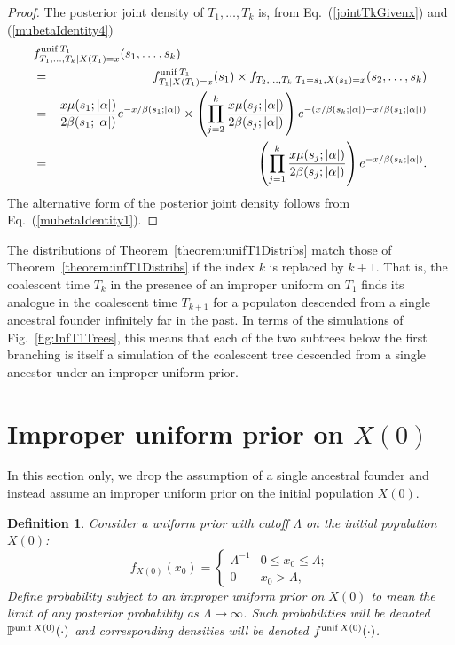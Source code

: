 \documentclass[preprint,12pt]{elsarticle}
\newtheorem{definition}{Definition}
\begin{document}
\begin{proof}
The posterior joint density of $T_1, \ldots, T_k$ is, from Eq.~(\ref{jointTkGivenx}) and (\ref{mubetaIdentity4})  
\begin{eqnarray*}
\lefteqn{f_{T_1, \ldots, T_k \mid X(T_1) = x}^{{\rm unif}\,T_1}(s_1, \ldots, s_k)} \nonumber \\ 
	& = & f_{T_1 \mid X(T_1) = x}^{{\rm unif}\,T_1}(s_1) \times f_{T_2, \ldots, T_k \mid T_1 = s_1, X(s_1) = x}(s_2, \ldots, s_k) \nonumber \\
	& = & \frac{x\mu(s_1; |\alpha|)}{2\beta(s_1; |\alpha|)} e^{-x/\beta(s_1; |\alpha|)} 
			\times \left(\prod_{j = 2}^k \frac{x \mu(s_j; |\alpha|)}{2\beta(s_j; |\alpha|)} \right) e^{-(x/\beta(s_k; |\alpha|) - x/\beta(s_1; |\alpha|))} \nonumber \\
	& = & \left(\prod_{j = 1}^k \frac{x \mu(s_j; |\alpha|)}{2\beta(s_j; |\alpha|)} \right) e^{-x/\beta(s_k; |\alpha|)}.
\end{eqnarray*} 
The alternative form of the posterior joint density follows from Eq.~(\ref{mubetaIdentity1}).  
\end{proof}

The distributions of Theorem~\ref{theorem:unifT1Distribs} match those of Theorem~\ref{theorem:infT1Distribs} if the index $k$ is replaced by $k + 1$.  
That is, the coalescent time $T_k$ in the presence of an improper uniform on $T_1$ finds its analogue in the coalescent time $T_{k + 1}$ for a populaton descended 
from a single ancestral founder infinitely far in the past.  In terms of the simulations of Fig.~\ref{fig:InfT1Trees}, this means that each of the two subtrees below the first 
branching is itself a simulation of the coalescent tree descended from a single ancestor under an improper uniform prior.
%
%
%

\section{Improper uniform prior on $X(0)$}
\label{sec:improperUnifX0}

In this section only, we drop the assumption of a single ancestral founder and instead assume an improper uniform prior on the initial 
population $X(0)$.  
\begin{definition}
Consider a uniform prior with cutoff $\Lambda$ on the initial population $X(0)$: 
\begin{equation}	\label{uniformPriorX0}
f_{X(0)}(x_0) = \begin{cases}
	\Lambda ^{-1} & 0 \le x_0 \le \Lambda; \\
	0                     & x_0 > \Lambda, 
	\end{cases}
\end{equation}
Define {\em probability subject to an improper uniform prior on $X(0)$} to mean the limit of any posterior probability as $\Lambda \to \infty$.  
Such probabilities will be denoted $\mathbb{P}^{{\rm unif}\,X(0)} (\cdot)$ and corresponding densities will be denoted $f^{{\rm unif}\,X(0)} (\cdot)$.
\end{definition}
\end{document}
